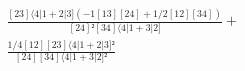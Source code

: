 \documentclass[varwidth, border=5pt]{standalone}
\begin{document}
\begin{my}
$\begin{gathered}
\scriptscriptstyle\frac{[23]⟨4|1+2|3](-1[13][24]+1/2[12][34])}{[24]²[34]⟨4|1+3|2]} +\\
\scriptscriptstyle\frac{1/4[12][23]⟨4|1+2|3]²}{[24][34]⟨4|1+3|2]²} \phantom{+}
\end{gathered}$
\end{my}
\end{document}
